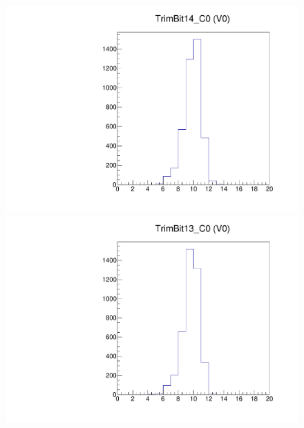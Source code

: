 \begin{figure}[!Hp]
\centering
\begin{minipage}{0.45\textwidth}
  \includegraphics[width=1.0\textwidth]{figures/trim_TrimBit14.pdf}
  \caption{}
  \label{fig:trim_TrimBit14}
\end{minipage}
\hspace{0.3cm}
\begin{minipage}{0.45\textwidth}
  \includegraphics[width=1.0\textwidth]{figures/trim_TrimBit13.pdf}
  \caption{}
  \label{fig:trim_TrimBit13}
\end{minipage}
\end{figure}

